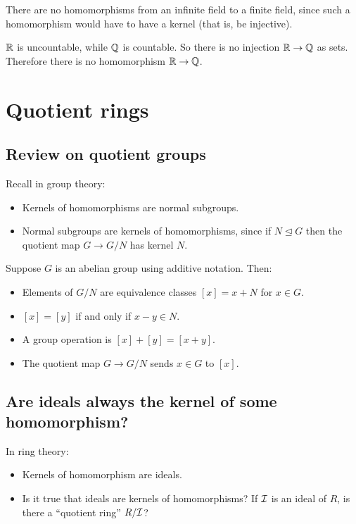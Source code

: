 \documentclass[12pt,letterpaper]{report}
\begin{document}
\begin{ex}
  There are no homomorphisms from an infinite field to a finite field, since such a homomorphism
  would have to have a kernel (that is, be injective).
\end{ex}

\begin{ex}
  $\mathbb{R}$ is uncountable, while $\mathbb{Q}$ is countable.
  So there is no injection $\mathbb{R} \to \mathbb{Q}$ as sets.
  Therefore there is no homomorphism $\mathbb{R} \to \mathbb{Q}$.
\end{ex}

\section{Quotient rings}

\subsection{Review on quotient groups}

Recall in group theory:
\begin{itemize}
  \item Kernels of homomorphisms are normal subgroups.
  \item Normal subgroups are kernels of homomorphisms, since if $N \trianglelefteq G$ then the
    quotient map $G \to G/N$ has kernel $N$.
\end{itemize}

Suppose $G$ is an abelian group using additive notation.
Then:
\begin{itemize}
  \item Elements of $G/N$ are equivalence classes $[x] = x + N$ for $x \in G$.
  \item $[x] = [y]$ if and only if $x - y \in N$.
  \item A group operation is $[x] + [y] = [x + y]$.
  \item The quotient map $G \to G/N$ sends $x \in G$ to $[x]$.
\end{itemize}

\pagebreak
\subsection{Are ideals always the kernel of some homomorphism?}

In ring theory:
\begin{itemize}
  \item Kernels of homomorphism are ideals.
  \item Is it true that ideals are kernels of homomorphisms?
    If $\mathcal{I}$ is an ideal of $R$, is there a ``quotient ring'' $R/\mathcal{I}$?
\end{itemize}
\end{document}
